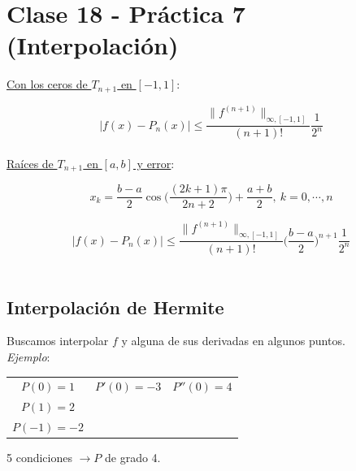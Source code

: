\section{Clase 18 - Pr\'actica 7 (Interpolaci\'on)}

\underline{Con los ceros de $T_{n + 1}$ en $[-1, 1]$}:

$$|f(x) - P_{n}(x)| \leq \frac{\|f^{(n + 1)}\|_{\infty, [-1, 1]}}{(n + 1)!}\frac{1}{2^{n}}$$\\

\underline{Ra\'ices de $T_{n + 1}$ en $[a, b]$ y error}:

$$x_{k} = \frac{b - a}{2}\cos\bigg(\frac{(2k + 1)\pi}{2n + 2}\bigg) + \frac{a + b}{2},\ k = 0, \cdots, n$$

$$|f(x) - P_{n}(x)| \leq \frac{\|f^{(n + 1)}\|_{\infty, [-1, 1]}}{(n + 1)!}\bigg(\frac{b - a}{2}\bigg)^{n + 1}\frac{1}{2^{n}}$$\\

\subsection{Interpolaci\'on de Hermite}

Buscamos interpolar $f$ y alguna de sus derivadas en algunos puntos.\\

\textit{Ejemplo}:

\begin{table}[h]
    \centering
    \begin{tabular}{c c c}
        $P(0) = 1$ & $P'(0) = -3$ & $P''(0) = 4$\\
        $P(1) = 2$ &  & \\
        $P(-1) = -2$ &  & \\
    \end{tabular}
\end{table}


5 condiciones $\rightarrow P$ de grado 4.\\

